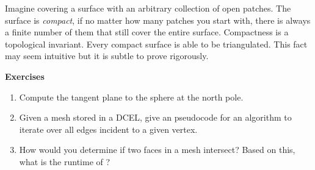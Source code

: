 Imagine covering a surface with an arbitrary collection of open patches.
The surface is \emph{compact}, if no matter how many patches you start with, there is always a finite number of them that still cover the entire surface.
Compactness is a topological invariant. 
Every compact surface is able to be triangulated. This fact may seem intuitive but it is subtle to prove
rigorously. 

\noindent \textbf{Exercises}


\begin{enumerate}
        \item Compute the tangent plane to the sphere at the north pole.

	\item Given a mesh stored in a DCEL, give an pseudocode for an algorithm to iterate over all edges incident to a given vertex.

	
	\item How would you determine if two faces in a mesh intersect? Based on this, what is the runtime of ?
	
	
\end{enumerate}

\pagebreak